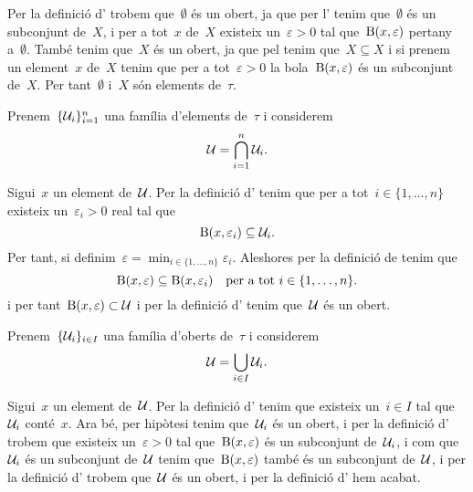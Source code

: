 \documentclass[../../main.tex]{subfiles}
\begin{document}
    \begin{solution}
        Per la definició d' trobem que~\(\emptyset\) és un obert, ja que per l' tenim que~\(\emptyset\) és un subconjunt de~\(X\), i per a tot~\(x\) de~\(X\) existeix un~\(\varepsilon>0\) tal que~\(\operatorname{B}(x,\varepsilon)\) pertany a~\(\emptyset\).
        També tenim que~\(X\) és un obert, ja que pel  tenim que~\(X\subseteq X\) i si prenem un element~\(x\) de~\(X\) tenim que per a tot~\(\varepsilon>0\) la bola~\(\operatorname{B}(x,\varepsilon)\) és un subconjunt de~\(X\).
        Per tant~\(\emptyset\) i~\(X\) són elements de~\(\tau\).

        Prenem~\(\{\mathcal{U}_{i}\}_{i=1}^{n}\) una família d'elements de~\(\tau\) i considerem
        \[
            \mathcal{U}=\bigcap_{i=1}^{n}\mathcal{U}_{i}.
        \]

        Sigui~\(x\) un element de~\(\mathcal{U}\).
        Per la definició d' tenim que per a tot~\(i\in\{1,\dots,n\}\) existeix un~\(\varepsilon_{i}>0\) real tal que
        \[
            \operatorname{B}(x,\varepsilon_{i})\subseteq\mathcal{U}_{i}.
        \]
        Per tant, si definim~\(\varepsilon=\min_{i\in\{1,\dots,n\}}\varepsilon_{i}\).
        Aleshores per la definició de  tenim que
        \[
            \operatorname{B}(x,\varepsilon)\subseteq\operatorname{B}(x,\varepsilon_{i})\quad\text{per a tot }i\in\{1,\dots,n\}.
        \]
        i per tant~\(\operatorname{B}(x,\varepsilon)\subset\mathcal{U}\) i per la definició d' tenim que~\(\mathcal{U}\) és un obert.

        Prenem~\(\{\mathcal{U}_{i}\}_{i\in I}\) una família d'oberts de~\(\tau\) i considerem
        \[
            \mathcal{U}=\bigcup_{i\in I}\mathcal{U}_{i}.
        \]

        Sigui~\(x\) un element de~\(\mathcal{U}\).
        Per la definició d' tenim que existeix un~\(i\in I\) tal que~\(\mathcal{U}_{i}\) conté~\(x\).
        Ara bé, per hipòtesi tenim que~\(\mathcal{U}_{i}\) és un obert, i per la definició d' trobem que existeix un~\(\varepsilon>0\) tal que~\(\operatorname{B}(x,\varepsilon)\) és un subconjunt de~\(\mathcal{U}_{i}\), i com que~\(\mathcal{U}_{i}\) és un subconjunt de~\(\mathcal{U}\) tenim que~\(\operatorname{B}(x,\varepsilon)\) també és un subconjunt de~\(\mathcal{U}\), i per la definició d' trobem que~\(\mathcal{U}\) és un obert, i per la definició d' hem acabat.
    \end{solution}
\end{document}
